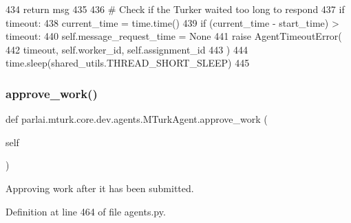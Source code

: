 \begin{DoxyCode}
434                     \textcolor{keywordflow}{return} msg
435 
436                 \textcolor{comment}{# Check if the Turker waited too long to respond}
437                 \textcolor{keywordflow}{if} timeout:
438                     current\_time = time.time()
439                     \textcolor{keywordflow}{if} (current\_time - start\_time) > timeout:
440                         self.message\_request\_time = \textcolor{keywordtype}{None}
441                         \textcolor{keywordflow}{raise} AgentTimeoutError(
442                             timeout, self.worker\_id, self.assignment\_id
443                         )
444                 time.sleep(shared\_utils.THREAD\_SHORT\_SLEEP)
445 
\end{DoxyCode}
\mbox{\label{classparlai_1_1mturk_1_1core_1_1dev_1_1agents_1_1MTurkAgent_adb726f0723f56988385241a17068bea6}} 
\subsubsection{\texorpdfstring{approve\+\_\+work()}{approve\_work()}}
{\footnotesize\ttfamily def parlai.\+mturk.\+core.\+dev.\+agents.\+M\+Turk\+Agent.\+approve\+\_\+work (\begin{DoxyParamCaption}\item[{}]{self }\end{DoxyParamCaption})}

\begin{DoxyVerb}Approving work after it has been submitted.
\end{DoxyVerb}
 

Definition at line 464 of file agents.\+py.


